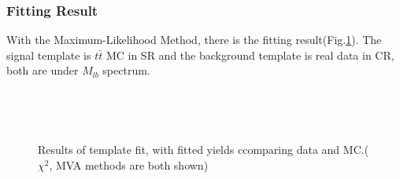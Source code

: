		\subsubsection{Fitting Result}
		\label{sssec:FittingResult}

		With the Maximum-Likelihood Method, there is the fitting result(Fig.\ref{BkgEst:fig:fit_result_yields}). The signal template is $t\bar{t}$ MC in SR and the background template is real data in CR, both are under $M_{lb}$ spectrum.

		\begin{figure}[H]
		\centering
			\\
		\end{figure}
		\FloatBarrier
		\begin{figure}[H]
		\centering
			\\
		\caption{Results of template fit, with fitted yields ccomparing data and MC.($\chi^2$, MVA methods are both shown)}
		\label{BkgEst:fig:fit_result_yields}
		\end{figure}
